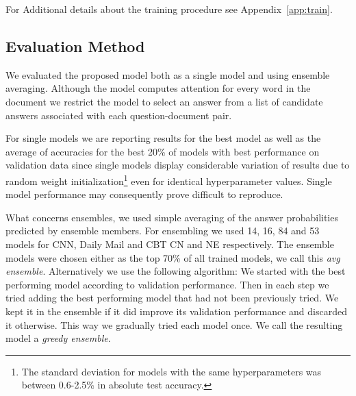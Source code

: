 \documentclass[11pt]{article}
\newcommand{\ONDRA}[1]{{\color{black}#1}}
\newcommand{\RUDAA}[1]{{\color{black}#1}}
\begin{document}
\RUDAA{
For Additional details about the training procedure see Appendix~\ref{app:train}.
}



\ONDRA{

\subsection{Evaluation Method}


We evaluated the proposed model both as a single model and using ensemble averaging. 
\RUDAA{Although the model computes attention for every word in the document we restrict the model to select an answer from a list of candidate answers associated with each question-document pair.}

For single models we are reporting results for the best model as well as the average of accuracies for the best 20\% of models with best performance on validation data since single models display considerable variation of results due to random weight initialization\footnote{The standard deviation for models with the same hyperparameters was between 0.6-2.5\% in absolute test accuracy.} even for identical hyperparameter values. Single model performance may consequently prove difficult to reproduce.
}

What concerns ensembles, we used simple averaging of the answer probabilities predicted by ensemble members. %
For ensembling we used 14, 16, 84 and 53 models for CNN, Daily Mail and CBT CN and NE respectively. The ensemble models were chosen either as the top 70\% of all trained models, we call this \textit{avg ensemble}.
Alternatively we use the following algorithm:
We started with the best performing model according to validation performance. Then in each step we tried adding the best performing model that had not been previously tried. We kept it in the ensemble if it did improve its validation performance and discarded it otherwise. This way we gradually tried each model once. We call the resulting model a \textit{greedy ensemble}.
\end{document}
